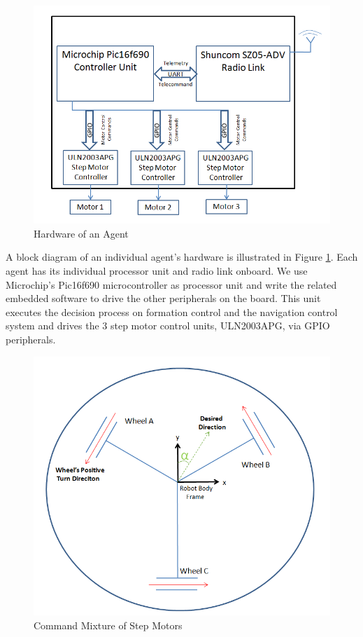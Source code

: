 		

		
\begin{figure}[H]
\caption{Hardware of an Agent} \label{indhardware_ref}
\centerline{\includegraphics[scale = 0.70]{agent}}
\end{figure} 
		
A block diagram of an individual agent's hardware is illustrated in Figure \ref{indhardware_ref}. Each agent has its individual processor unit and radio link onboard. We use Microchip's Pic16f690 microcontroller as processor unit and write the related embedded software to drive the other peripherals on the board. This unit executes the decision process on formation control and the navigation control system and drives the 3 step motor control units, ULN2003APG, via GPIO peripherals.
		
\begin{figure}[H]
\caption{Command Mixture of Step Motors} \label{ccmb_ref}
\centerline{\includegraphics[scale = 0.65]{ccmb}}
\end{figure} 

